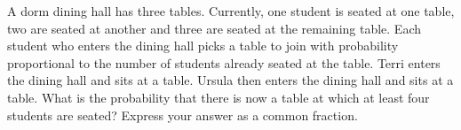 A dorm dining hall has three tables. Currently, one student is seated at one table, two are seated at another and three are seated at the remaining table. Each student who enters the dining hall picks a table to join with probability proportional to the number of students already seated at the table. Terri enters the dining hall and sits at a table. Ursula then enters the dining hall and sits at a table. What is the probability that there is now a table at which at least four students are seated? Express your answer as a common fraction.
